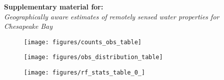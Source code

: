 \documentclass[12pt]{article}
\begin{document}
\begin{center}
\textbf{Supplementary material for:}\\
\emph{Geographically aware estimates of remotely sensed water properties for Chesapeake Bay}
\end{center}

\begin{figure}[h!]
    \begin{center}
          \texttt{[image: figures/counts\_obs\_table]}
    \end{center}    
\end{figure}

\begin{figure}[h!]
    \begin{center}
          \texttt{[image: figures/obs\_distribution\_table]}
    \end{center}    
\end{figure}

\begin{figure}[h!]
    \begin{center}
          \texttt{[image: figures/rf\_stats\_table\_0\_]}
    \end{center}    
\end{figure}

\clearpage
\end{document}
